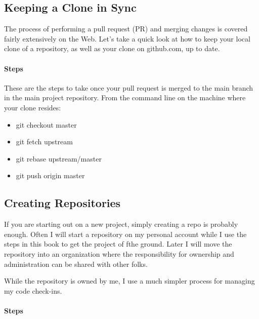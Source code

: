 \hypertarget{keeping-a-clone-in-sync}{%
      \subsection{Keeping a Clone in Sync}\label{keeping-a-clone-in-sync}}

The process of performing a pull request (PR) and merging changes is
covered fairly extensively on the Web. Let's take a quick look at how to
keep your local clone of a repository, as well as your clone on
github.com, up to date.

\hypertarget{steps-1}{%
      \paragraph{Steps}\label{steps-1}}

These are the steps to take once your pull request is merged to the main
branch in the main project repository. From the command line on the
machine where your clone resides:

\begin{itemize}
      \item
            git checkout master
      \item
            git fetch upstream
      \item
            git rebase upstream/master
      \item
            git push origin master
\end{itemize}


\subsection{Creating Repositories}

\justify
If you are starting out on a new project, simply creating a repo is
probably enough. Often I will start a repository on my personal account
while I use the steps in this book to get the project of fthe ground.
Later I will move the repository into an organization where the
responsibility for ownership and administration can be shared with other
folks.

\justify
While the repository is owned by me, I use a much simpler process for
managing my code check-ins.

\hypertarget{steps-2}{%
      \paragraph{Steps}\label{steps-2}}

